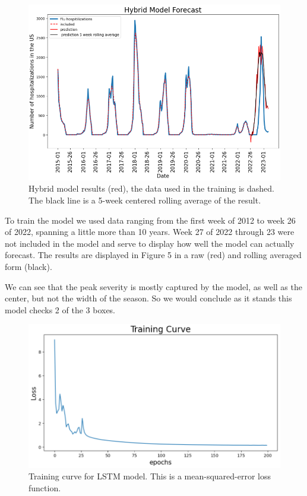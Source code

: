 \documentclass[12pt,a4paper,english]{article}
\begin{document}
	\begin{figure}[h!]
		\begin{center}
		\includegraphics[scale=0.5]{Pictures/hy_model.png}
		\caption{Hybrid model results (red), the data used in the training is dashed. The black line is a 5-week centered rolling average of the result.}
		\end{center}
		\label{fig:hy_model}
	\end{figure}
\FloatBarrier

To train the model we used data ranging from the first week of 2012 to week 26 of 2022, spanning a little more than 10 years. Week 27 of 2022 through 23 were not included in the model and serve to display how well the model can actually forecast. The results are displayed in Figure 5 in a raw (red) and rolling averaged form (black). 

We can see that the peak severity is mostly captured by the model, as well as the center, but not the width of the season. So we would conclude as it stands this model checks 2 of the 3 boxes. 




	\begin{figure}[h!]
		\begin{center}
		\includegraphics[scale=0.6]{Pictures/flu_train.png}
		\caption{Training curve for LSTM model. This is a mean-squared-error loss function.}
		\end{center}
		\label{fig:lstm_train}
	\end{figure}
\FloatBarrier
\end{document}
